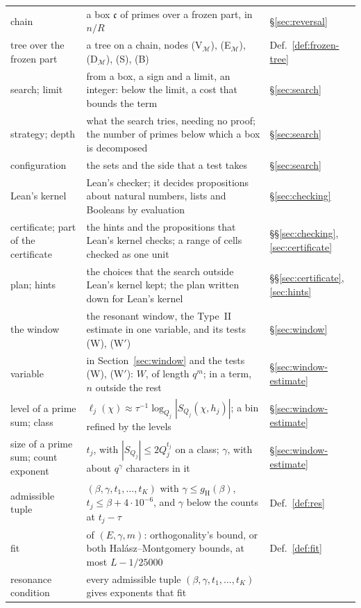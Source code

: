 \documentclass[11pt]{article}
\theoremstyle{definition}
\begin{document}
{\begin{longtable}{@{}>{\raggedright\arraybackslash}p{}
  >{\raggedright\arraybackslash}p{}
  >{\raggedright\arraybackslash}p{}@{}}
chain & a box $\mathfrak c$ of primes over a frozen part, in $n/R$ & \S\ref{sec:reversal} \\
tree over the frozen part & a tree on a chain, nodes (V$_{\mathcal M}$), (E$_{\mathcal M}$), (D$_{\mathcal M}$), (S),
  (B) & Def.~\ref{def:frozen-tree} \\
search; limit & from a box, a sign and a limit, an integer: below the limit, a cost that bounds the term &
  \S\ref{sec:search} \\
strategy; depth & what the search tries, needing no proof; the number of primes below which a box is decomposed &
  \S\ref{sec:search} \\
configuration & the sets and the side that a test takes & \S\ref{sec:search} \\
Lean's kernel & Lean's checker; it decides propositions about natural numbers, lists and Booleans by
  evaluation & \S\ref{sec:checking} \\
certificate; part of the certificate & the hints and the propositions that Lean's kernel checks; a range of cells
  checked as one unit & \S\S\ref{sec:checking}, \ref{sec:certificate} \\
plan; hints & the choices that the search outside Lean's kernel kept; the plan written down for Lean's kernel &
  \S\S\ref{sec:certificate}, \ref{sec:hints} \\
the window & the resonant window, the Type~II estimate in one variable, and its tests (W), (W$'$) &
  \S\ref{sec:window} \\
variable & in Section~\ref{sec:window} and the tests (W), (W$'$): $W$, of length $q^m$; in a term, $n$ outside the
  rest & \S\ref{sec:window-estimate} \\
level of a prime sum; class & $\ell_j(\chi) \approx \tau^{-1} \log_{Q_j} |S_{Q_j}(\chi, h_j)|$; a bin refined by the
  levels & \S\ref{sec:window-estimate} \\
size of a prime sum; count exponent & $t_j$, with $|S_{Q_j}| \le 2Q_j^{t_j}$ on a class; $\gamma$, with about
  $q^\gamma$ characters in it & \S\ref{sec:window-estimate} \\
admissible tuple & $(\beta, \gamma, t_1, \dots, t_K)$ with $\gamma \le g_{\mathrm H}(\beta)$, $t_j \le \beta + 4
  \cdot 10^{-6}$, and $\gamma$ below the counts at $t_j - \tau$ & Def.~\ref{def:res} \\
fit & of $(E, \gamma, m)$: orthogonality's bound, or both Hal\'asz--Montgomery bounds, at most $L - 1/25000$ &
  Def.~\ref{def:fit} \\
resonance condition & every admissible tuple $(\beta, \gamma, t_1, \dots, t_K)$ gives exponents that fit &

\end{longtable}}
\end{document}
